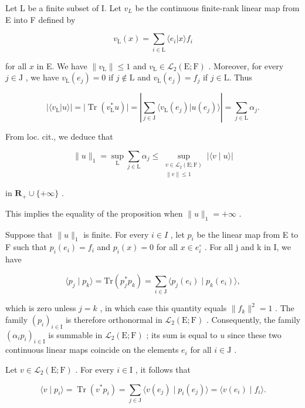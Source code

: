 Let L be a finite subset of I. Let \(v_{L}\) be the continuous finite-rank linear map from E into F defined by

\[
v _ {\mathrm{L}} (x) = \sum_ {i \in \mathrm{L}} \langle e _ {i} | x \rangle f _ {i}
\]

for all \(x\) in E. We have \(\| v_{\mathrm{L}}\| \leqslant 1\) and \(v_{\mathrm{L}}\in \mathcal{L}_{2}(\mathrm{E};\mathrm{F})\) . Moreover, for every \(j\in \mathrm{J}\) , we have \(v_{\mathrm{L}}(e_j) = 0\) if \(j\notin \mathrm{L}\) and \(v_{\mathrm{L}}(e_j) = f_j\) if \(j\in \mathrm{L}\). Thus

\[
| \langle v _ {\mathrm{L}} | u \rangle | = | \operatorname{Tr} (v _ {\mathrm{L}} ^ {*} u) | = \left| \sum_ {j \in \mathrm{J}} \langle v _ {\mathrm{L}} (e _ {j}) | u (e _ {j}) \rangle \right| = \sum_ {j \in \mathrm{L}} \alpha_ {j}.
\]

From loc. cit., we deduce that

\[
\| u\|_{1} = \sup_{\text{L}}\sum_{j\in \text{L}}\alpha_{j}\leqslant \sup_{\substack{v\in \mathcal{L}_{2}(\text{E};\text{F})\\ \| v\| \leqslant 1}}|\langle v\mid u\rangle |\tag{10}
\]

in \(\mathbf{R}_{+}\cup\{+\infty\}\) .

This implies the equality of the proposition when \(\|u\|_{1}=+\infty\) .

Suppose that \(\|u\|_{1}\) is finite. For every \(i \in I\) , let \(p_{i}\) be the linear map from E to F such that \(p_{i}(e_{i}) = f_{i}\) and \(p_{i}(x) = 0\) for all \(x \in e_{i}^{\circ}\) . For all j and k in I, we have

\[
\langle p _ {j} \mid p _ {k} \rangle = \mathrm{Tr} (p _ {j} ^ {*} p _ {k}) = \sum_ {i \in \mathrm{J}} \langle p _ {j} (e _ {i}) \mid p _ {k} (e _ {i}) \rangle ,
\]

which is zero unless \(j = k\) , in which case this quantity equals \(\| f_k\|^2 = 1\) . The family \((p_i)_{i \in \mathrm{I}}\) is therefore orthonormal in \(\mathcal{L}_2(\mathrm{E};\mathrm{F})\) . Consequently, the family \((\alpha_i p_i)_{i \in \mathrm{I}}\) is summable in \(\mathcal{L}_2(\mathrm{E};\mathrm{F})\) ; its sum is equal to \(u\) since these two continuous linear maps coincide on the elements \(e_i\) for all \(i \in \mathrm{J}\) .

Let \(v \in \mathcal{L}_2(\mathrm{E};\mathrm{F})\) . For every \(i \in \mathrm{I}\) , it follows that

\[
\langle v \mid p _ {i} \rangle = \operatorname{Tr} (v ^ {*} p _ {i}) = \sum_ {j \in \mathrm{J}} \langle v (e _ {j}) \mid p _ {i} (e _ {j}) \rangle = \langle v (e _ {i}) \mid f _ {i} \rangle .
\]

